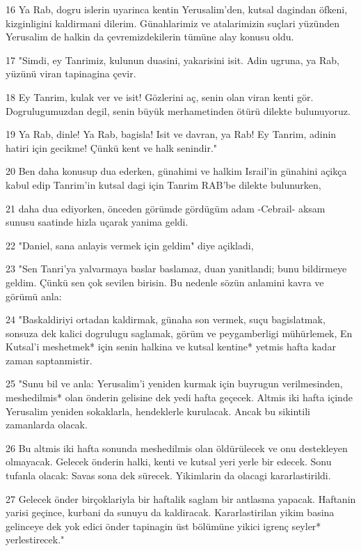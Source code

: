 \par 16 Ya Rab, dogru islerin uyarinca kentin Yerusalim'den, kutsal dagindan öfkeni, kizginligini kaldirmani dilerim. Günahlarimiz ve atalarimizin suçlari yüzünden Yerusalim de halkin da çevremizdekilerin tümüne alay konusu oldu.
\par 17 "Simdi, ey Tanrimiz, kulunun duasini, yakarisini isit. Adin ugruna, ya Rab, yüzünü viran tapinagina çevir.
\par 18 Ey Tanrim, kulak ver ve isit! Gözlerini aç, senin olan viran kenti gör. Dogrulugumuzdan degil, senin büyük merhametinden ötürü dilekte bulunuyoruz.
\par 19 Ya Rab, dinle! Ya Rab, bagisla! Isit ve davran, ya Rab! Ey Tanrim, adinin hatiri için gecikme! Çünkü kent ve halk senindir."
\par 20 Ben daha konusup dua ederken, günahimi ve halkim Israil'in günahini açikça kabul edip Tanrim'in kutsal dagi için Tanrim RAB'be dilekte bulunurken,
\par 21 daha dua ediyorken, önceden görümde gördügüm adam -Cebrail- aksam sunusu saatinde hizla uçarak yanima geldi.
\par 22 "Daniel, sana anlayis vermek için geldim" diye açikladi,
\par 23 "Sen Tanri'ya yalvarmaya baslar baslamaz, duan yanitlandi; bunu bildirmeye geldim. Çünkü sen çok sevilen birisin. Bu nedenle sözün anlamini kavra ve görümü anla:
\par 24 "Baskaldiriyi ortadan kaldirmak, günaha son vermek, suçu bagislatmak, sonsuza dek kalici dogrulugu saglamak, görüm ve peygamberligi mühürlemek, En Kutsal'i meshetmek* için senin halkina ve kutsal kentine* yetmis hafta kadar zaman saptanmistir.
\par 25 "Sunu bil ve anla: Yerusalim'i yeniden kurmak için buyrugun verilmesinden, meshedilmis* olan önderin gelisine dek yedi hafta geçecek. Altmis iki hafta içinde Yerusalim yeniden sokaklarla, hendeklerle kurulacak. Ancak bu sikintili zamanlarda olacak.
\par 26 Bu altmis iki hafta sonunda meshedilmis olan öldürülecek ve onu destekleyen olmayacak. Gelecek önderin halki, kenti ve kutsal yeri yerle bir edecek. Sonu tufanla olacak: Savas sona dek sürecek. Yikimlarin da olacagi kararlastirildi.
\par 27 Gelecek önder birçoklariyla bir haftalik saglam bir antlasma yapacak. Haftanin yarisi geçince, kurbani da sunuyu da kaldiracak. Kararlastirilan yikim basina gelinceye dek yok edici önder tapinagin üst bölümüne yikici igrenç seyler* yerlestirecek."


